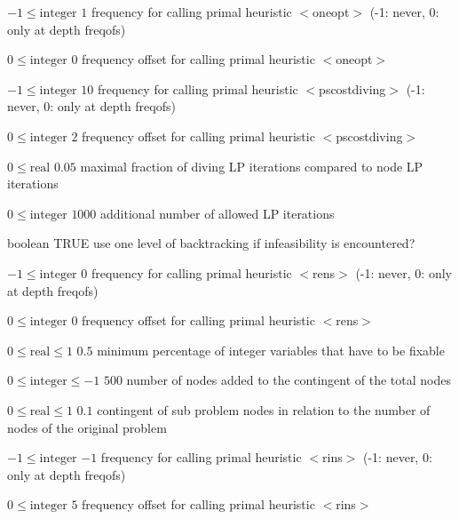 %
{$-1\leq\textrm{integer}$}%
{$1$}%
{frequency for calling primal heuristic $<$oneopt$>$ (-1: never, 0: only at depth freqofs)}%
{}

%
{$0\leq\textrm{integer}$}%
{$0$}%
{frequency offset for calling primal heuristic $<$oneopt$>$}%
{}

%
{$-1\leq\textrm{integer}$}%
{$10$}%
{frequency for calling primal heuristic $<$pscostdiving$>$ (-1: never, 0: only at depth freqofs)}%
{}

%
{$0\leq\textrm{integer}$}%
{$2$}%
{frequency offset for calling primal heuristic $<$pscostdiving$>$}%
{}

%
{$0\leq\textrm{real}$}%
{$0.05$}%
{maximal fraction of diving LP iterations compared to node LP iterations}%
{}

%
{$0\leq\textrm{integer}$}%
{$1000$}%
{additional number of allowed LP iterations}%
{}

%
{boolean}%
{TRUE}%
{use one level of backtracking if infeasibility is encountered?}%
{}

%
{$-1\leq\textrm{integer}$}%
{$0$}%
{frequency for calling primal heuristic $<$rens$>$ (-1: never, 0: only at depth freqofs)}%
{}

%
{$0\leq\textrm{integer}$}%
{$0$}%
{frequency offset for calling primal heuristic $<$rens$>$}%
{}

%
{$0\leq\textrm{real}\leq1$}%
{$0.5$}%
{minimum percentage of integer variables that have to be fixable }%
{}

%
{$0\leq\textrm{integer}\leq-1$}%
{$500$}%
{number of nodes added to the contingent of the total nodes}%
{}

%
{$0\leq\textrm{real}\leq1$}%
{$0.1$}%
{contingent of sub problem nodes in relation to the number of nodes of the original problem}%
{}

%
{$-1\leq\textrm{integer}$}%
{$-1$}%
{frequency for calling primal heuristic $<$rins$>$ (-1: never, 0: only at depth freqofs)}%
{}

%
{$0\leq\textrm{integer}$}%
{$5$}%
{frequency offset for calling primal heuristic $<$rins$>$}%
{}

